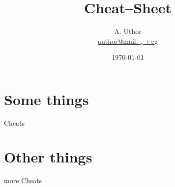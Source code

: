\documentclass[a4paper,landscape,columns=3]{CheatSheet}
\title{Cheat--Sheet}
\author{A. Uthor\\\href{mailto:author@mail.eg}{author@mail.
,→ eg}}
\date{\today}
\begin{document}
\maketitle
\section{Some things}
Cheats
\section{Other things}
more Cheats
\end{document}
